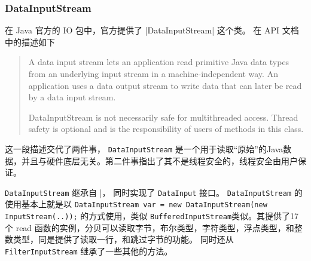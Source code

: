 
\subsubsection{DataInputStream}
\label{sec:uml:input:datainputstream}

在 Java 官方的 IO 包中，官方提供了 \lstline|DataInputStream| 这个类。
在 API 文档中的描述如下
\begin{quote}
  A data input stream lets an application read primitive Java data types from an underlying input stream in a machine-independent way. 
  An application uses a data output stream to write data that can later be read by a data input stream.

  DataInputStream is not necessarily safe for multithreaded access. Thread safety is optional and is the responsibility of users of methods in this class.
\end{quote}

这一段描述交代了两件事， \lstinline|DataInputStream| 是一个用于读取“原始”的Java数据，并且与硬件底层无关。第二件事指出了其不是线程安全的，线程安全由用户保证。

\lstinline|DataInputStream| 继承自 \FilterInputStream|， 同时实现了 \lstinline|DataInput| 接口。
\lstinline|DataInputStream| 的使用基本上就是以 \lstinline|DataInputStream var = new DataInputStream(new InputStream(..));| 的方式使用，类似
\lstinline|BufferedInputStream|类似。其提供了17个 read 函数的实例，分贝可以读取字节，布尔类型，字符类型，浮点类型，和整数类型，同是提供了读取一行，和跳过字节的功能。
同时还从 \lstinline|FilterInputStream| 继承了一些其他的方法。

